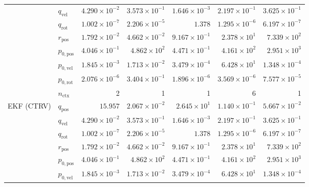 \begin{table}[t]
\begin{tabular}{llrrrrr}
               & $q_\text{vel}$        & $4.290 \times 10^{-2}$ & $3.573 \times 10^{-1}$ & $1.646 \times 10^{-3}$ & $2.197 \times 10^{-1}$ & $3.625 \times 10^{-1}$ \\
               & $q_\text{rot}$        & $1.002 \times 10^{-7}$ & $2.206 \times 10^{-5}$ & $1.378$                & $1.295 \times 10^{-6}$ & $6.197 \times 10^{-7}$ \\
               & $r_\text{pos}$        & $1.792 \times 10^{-2}$ & $4.662 \times 10^{-2}$ & $9.167 \times 10^{-1}$ & $2.378 \times 10^{1}$  & $7.339 \times 10^{2}$  \\
               & $p_{0,\text{pos}}$    & $4.046 \times 10^{-1}$ & $4.862 \times 10^{2}$  & $4.471 \times 10^{-1}$ & $4.161 \times 10^{2}$  & $2.951 \times 10^{3}$  \\
               & $p_{0,\text{vel}}$    & $1.845 \times 10^{-3}$ & $1.713 \times 10^{-2}$ & $3.479 \times 10^{-4}$ & $6.428 \times 10^{1}$  & $1.348 \times 10^{-4}$ \\
               & $p_{0,\text{rot}}$    & $2.076 \times 10^{-6}$ & $3.404 \times 10^{-1}$ & $1.896 \times 10^{-6}$ & $3.569 \times 10^{-6}$ & $7.577 \times 10^{-5}$ \\
               & $n_\text{ctx}$        & 2                      & 1                      & 1                      & 6                      & 1                      \\
EKF (CTRV)     & $q_\text{pos}$        & $15.957$               & $2.067 \times 10^{-2}$ & $2.645 \times 10^{1}$  & $1.140 \times 10^{-1}$ & \cellcolor{green!15}$5.667 \times 10^{-2}$ \\
               & $q_\text{vel}$        & $4.290 \times 10^{-2}$ & $3.573 \times 10^{-1}$ & $1.646 \times 10^{-3}$ & $2.197 \times 10^{-1}$ & $3.625 \times 10^{-1}$ \\
               & $q_\text{rot}$        & $1.002 \times 10^{-7}$ & $2.206 \times 10^{-5}$ & $1.378$                & $1.295 \times 10^{-6}$ & $6.197 \times 10^{-7}$ \\
               & $r_\text{pos}$        & $1.792 \times 10^{-2}$ & $4.662 \times 10^{-2}$ & $9.167 \times 10^{-1}$ & $2.378 \times 10^{1}$  & \cellcolor{green!15}$7.339 \times 10^{2}$  \\
               & $p_{0,\text{pos}}$    & $4.046 \times 10^{-1}$ & $4.862 \times 10^{2}$  & $4.471 \times 10^{-1}$ & $4.161 \times 10^{2}$  & $2.951 \times 10^{3}$  \\
               & $p_{0,\text{vel}}$    & $1.845 \times 10^{-3}$ & $1.713 \times 10^{-2}$ & $3.479 \times 10^{-4}$ & $6.428 \times 10^{1}$  & $1.348 \times 10^{-4}$ \\

\end{tabular}
\end{table}
